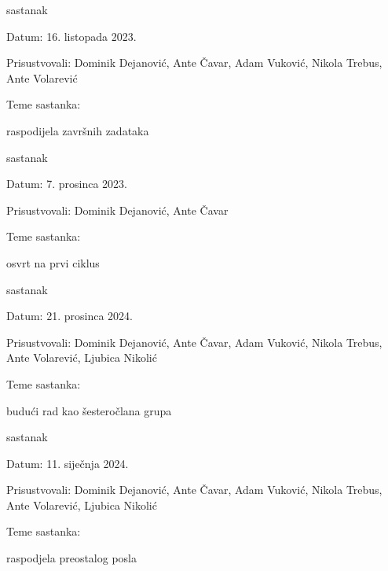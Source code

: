 \begin{packed_enum}
			\item  sastanak
			\item[] \begin{packed_item}
				\item Datum: 16. listopada 2023.
				\item Prisustvovali: Dominik Dejanović, Ante Čavar, Adam Vuković, Nikola Trebus, Ante Volarević
				\item Teme sastanka:
				\begin{packed_item}
					\item raspodijela završnih zadataka
				\end{packed_item}
			\end{packed_item}
			\item  sastanak
            \item[] \begin{packed_item}
                \item Datum: 7. prosinca 2023.
            \item Prisustvovali: Dominik Dejanović, Ante Čavar
                \item Teme sastanka:
                \begin{packed_item}
                    \item osvrt na prvi ciklus
                \end{packed_item}
            \end{packed_item}


            \item  sastanak
            \item[] \begin{packed_item}
                \item Datum: 21. prosinca 2024.
                \item Prisustvovali: Dominik Dejanović, Ante Čavar, Adam Vuković, Nikola Trebus, Ante Volarević, Ljubica Nikolić
                \item Teme sastanka: 
                \begin{packed_item}
                    \item budući rad kao šesteročlana grupa
                \end{packed_item}
            \end{packed_item}

            \item  sastanak
            \item[] \begin{packed_item}
                \item Datum: 11. siječnja 2024.
                \item Prisustvovali: Dominik Dejanović, Ante Čavar, Adam Vuković, Nikola Trebus, Ante Volarević, Ljubica Nikolić
                \item Teme sastanka:
                \begin{packed_item}
                    \item raspodjela preostalog posla
                \end{packed_item}
            \end{packed_item}


\end{packed_enum}
